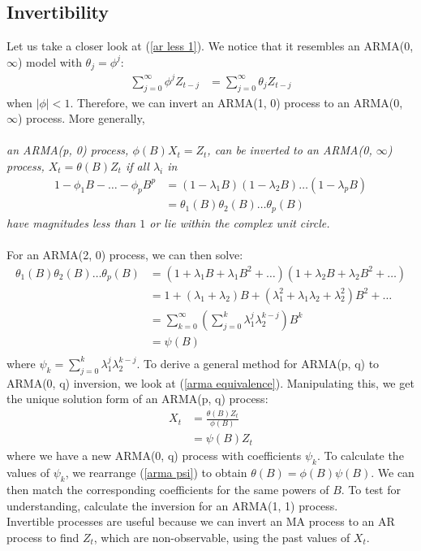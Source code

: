 \documentclass{article}
\begin{document}
\subsection{Invertibility}
Let us take a closer look at (\ref{ar less 1}). We notice that it resembles an ARMA(0, $\infty$) model with $\theta_j=\phi^j$:
\begin{align}\label{arma equivalence}
    \sum_{j=0}^{\infty} \phi^j Z_{t-j} &= \sum_{j=0}^{\infty} \theta_j Z_{t-j}
\end{align}
when $\lvert \phi \rvert < 1$. Therefore, we can invert an ARMA(1, 0) process to an ARMA(0, $\infty$) process. More generally, \\\\
\textit{an ARMA(p, 0) process, $\phi(B)X_t=Z_t$, can be inverted to an ARMA(0, $\infty$) process, $X_t=\theta(B)Z_t$ if all $\lambda_i$ in 
\begin{align}\label{arma inversion}
    1-\phi_1B-\ldots-\phi_pB^p&=(1-\lambda_1B)(1-\lambda_2B)\ldots(1-\lambda_pB)\nonumber\nonumber\\
    &= \theta_1(B)\theta_2(B)\ldots \theta_p(B)
\end{align}
have magnitudes less than $1$ or lie within the complex unit circle.\\\\
}
For an ARMA(2, 0) process, we can then solve:
\begin{align}\label{arma psi derivation}
    \theta_1(B)\theta_2(B)\ldots \theta_p(B) &= (1+\lambda_1B+\lambda_1B^2+\ldots) (1+\lambda_2B+\lambda_2B^2+\ldots) \nonumber\\
    &= 1+(\lambda_1+\lambda_2)B+(\lambda_1^2+\lambda_1\lambda_2+\lambda_2^2)B^2+\ldots\nonumber\\
    &=\sum_{k=0}^{\infty}(\sum_{j=0}^k \lambda_1^j\lambda_2^{k-j})B^k\\
    &= \psi(B)\nonumber\\
\end{align}
where $\psi_k=\sum_{j=0}^k \lambda_1^j\lambda_2^{k-j}$. To derive a general method for ARMA(p, q) to ARMA(0, q) inversion, we look at (\ref{arma equivalence}). Manipulating this, we get the unique solution form of an ARMA(p, q) process:
\begin{align}\label{arma psi}
    X_t &= \frac{\theta(B)Z_t}{\phi(B)}\nonumber\\
    &= \psi(B)Z_t
\end{align}
where we have a new ARMA(0, q) process with coefficients $\psi_k$. To calculate the values of $\psi_k$, we rearrange (\ref{arma psi}) to obtain $\theta(B)=\phi(B)\psi(B)$. We can then match the corresponding coefficients for the same powers of $B$. To test for understanding, calculate the inversion for an ARMA(1, 1) process.\\
Invertible processes are useful because we can invert an MA process to an AR process to find $Z_t$, which are non-observable, using the past values of $X_t$.
\end{document}
